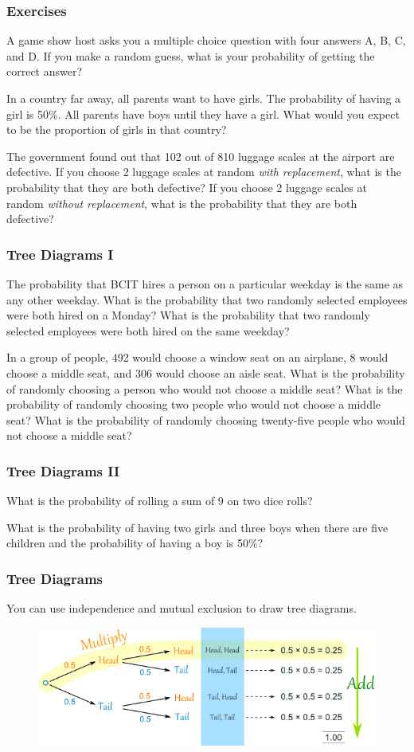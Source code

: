 \documentclass[xcolor=dvipsnames]{beamer}
\begin{document}
\begin{frame}
  \frametitle{Exercises}
{\ubung} A game show host asks you a multiple choice
question with four answers A, B, C, and D. If you make a random guess,
what is your probability of getting the correct answer?

{\ubung} In a country far away, all parents want to have
girls. The probability of having a girl is 50\%. All parents have boys
until they have a girl. What would you expect to be the proportion of
girls in that country?

{\ubung} The government found out that 102 out of 810
luggage scales at the airport are defective. If you choose 2 luggage
scales at random \emph{with replacement}, what is the probability that
they are both defective? If you choose 2 luggage scales at random
\emph{without replacement}, what is the probability that they are both
defective?
\end{frame}

\begin{frame}
  \frametitle{Tree Diagrams I}
{\ubung} The probability that BCIT hires a person on a
particular weekday is the same as any other weekday. What is the
probability that two randomly selected employees were both hired on a
Monday? What is the probability that two randomly selected employees
were both hired on the same weekday?

{\ubung} In a group of people, 492 would choose a window
seat on an airplane, 8 would choose a middle seat, and 306 would
choose an aisle seat. What is the probability of randomly choosing a
person who would not choose a middle seat? What is the probability of
randomly choosing two people who would not choose a middle seat? What
is the probability of randomly choosing twenty-five people who would
not choose a middle seat?
\end{frame}

\begin{frame}
  \frametitle{Tree Diagrams II}
{\ubung} What is the probability of rolling a sum of 9 on
two dice rolls?

{\ubung} What is the probability of having two girls and
three boys when there are five children and the probability of having
a boy is 50\%?
\end{frame}

\begin{frame}
  \frametitle{Tree Diagrams}
You can use independence and mutual exclusion to draw tree diagrams.
\begin{figure}[h]
\includegraphics[scale=.5]{./diagrams/tree.png}
\end{figure}
\end{frame}
\end{document}
